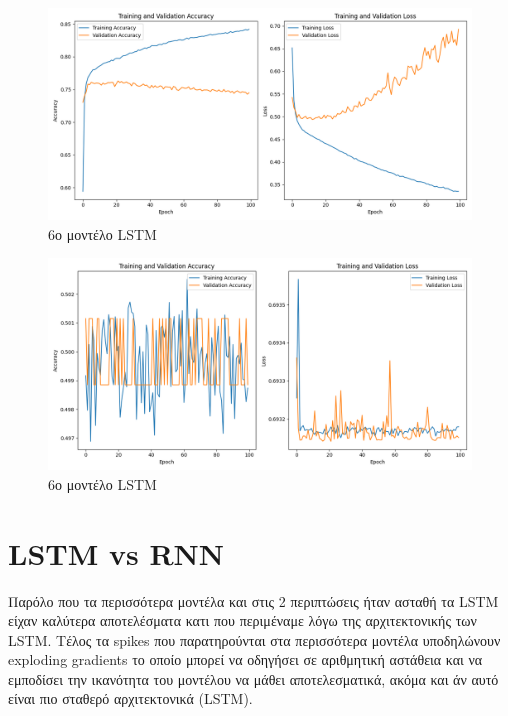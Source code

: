 \begin{figure}[ht]
	\centering
	\includegraphics[width=1\linewidth]{Results/LSTM/lstm6.png}
	\caption{ 6ο μοντέλο LSTM}
	\label{f:g10}	
\end{figure}

\begin{figure}[ht]
	\centering
	\includegraphics[width=1\linewidth]{Results/LSTM/lstm7.png}
	\caption{ 6ο μοντέλο LSTM}
	\label{f:g11}	
\end{figure}

\clearpage

\section{LSTM vs RNN}

Παρόλο που τα περισσότερα μοντέλα και στις 2 περιπτώσεις ήταν ασταθή τα LSTM είχαν καλύτερα αποτελέσματα κατι που περιμέναμε λόγω της αρχιτεκτονικής των LSTM. Tέλος τα spikes που παρατηρούνται στα περισσότερα μοντέλα υποδηλώνουν exploding gradients το οποίο μπορεί να οδηγήσει σε αριθμητική αστάθεια και να εμποδίσει την ικανότητα του μοντέλου να μάθει αποτελεσματικά, ακόμα και άν αυτό είναι πιο σταθερό αρχιτεκτονικά (LSTM).